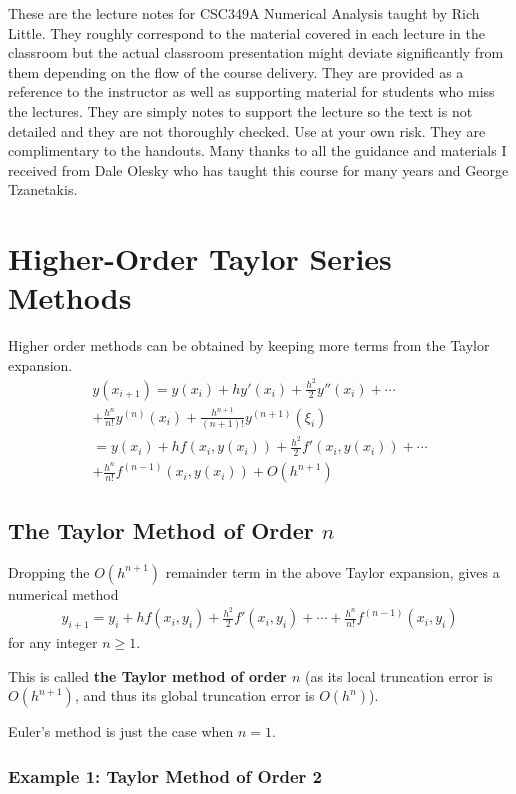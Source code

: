 \documentclass [titlepage,12pt,letter] {article}
\begin{document}
 


These are the lecture notes for CSC349A Numerical Analysis taught by
Rich Little. They roughly correspond to
the material covered in each lecture in the classroom but the actual
classroom presentation might deviate significantly from them depending
on the flow of the course delivery. They are provided as a reference to
the instructor as well as supporting material for students who miss
the lectures. They are simply notes to support the lecture so the text
is not detailed and they are not thoroughly checked. Use at your own
risk. They are complimentary to the handouts. Many thanks to all the
guidance and materials I received from Dale Olesky who has taught this
course for many years and George Tzanetakis. 

\section{Higher-Order Taylor Series Methods}

Higher order methods can be obtained by keeping more terms from the Taylor expansion.
\begin{multline*}
y(x_{i+1})=y(x_i)+hy'(x_i)+\frac{h^2}{2}y''(x_i)+\dotsm \\
	+\frac{h^n}{n!}y^{(n)}(x_i)+\frac{h^{n+1}}{(n+1)!}y^{(n+1)}(\xi_i) \\
=y(x_i)+hf(x_i,y(x_i))+\frac{h^2}{2}f'(x_i,y(x_i))+\dotsm \\
	+\frac{h^n}{n!}f^{(n-1)}(x_i,y(x_i))+O(h^{n+1})
\end{multline*}

\subsection{The Taylor Method of Order $n$}

Dropping the $O(h^{n+1})$ remainder term in the above Taylor expansion, gives a numerical method
\begin{multline*}
y_{i+1}=y_i+hf(x_i,y_i)+\frac{h^2}{2}f'(x_i,y_i)+\dotsm 
	+\frac{h^n}{n!}f^{(n-1)}(x_i,y_i)
\end{multline*}
for any integer $n \geq 1$.

This is called {\bf the Taylor method of order $n$} (as its local truncation error is $O(h^{n+1})$, and thus its global truncation error is $O(h^n)$).

Euler’s method is just the case when $n=1$.


\subsubsection{Example 1: Taylor Method of Order 2}
\end{document}
